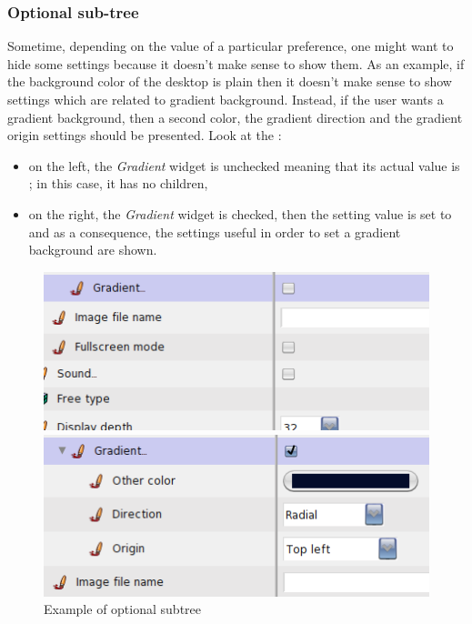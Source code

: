 \documentclass[a4paper,10pt,twoside]{book}
\begin{document}
\subsubsection{Optional sub-tree}
Sometime, depending on the value of a particular preference, one might want to hide some settings because it doesn't make sense to show them. As an example, if the background color of the desktop is plain then it doesn't make sense to show settings which are related to gradient background. Instead, if the user wants a gradient background, then a second color, the gradient direction and the gradient origin settings should be presented. 
Look at the :
\begin{itemize}
\item on the left, the \textit{Gradient} widget is unchecked meaning that its actual value is ; in this case, it has no children, 
\item on the right, the \textit{Gradient} widget is checked, then the setting value is set to  and as a consequence, the settings useful in order to set a gradient background are shown.
\end{itemize}
\begin{figure}[tbh]
\begin{center}
\begin{minipage}[t]{0.49\linewidth}
\includegraphics[scale=0.35]{smart-subtree1}
\end{minipage}
\begin{minipage}[t]{0.49\linewidth}
\includegraphics[scale=0.35]{smart-subtree2}
\end{minipage}
\caption{Example of optional subtree}
\end{center}
\end{figure}
\end{document}
